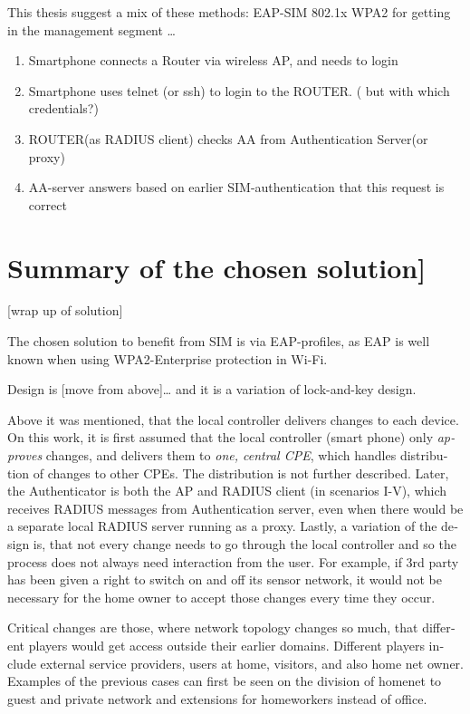 \documentclass[12pt,a4paper,english]{tutthesis}
\begin{document}
\begin{otherlanguage}{english}
This thesis suggest a mix of these methods: EAP-SIM 802.1x WPA2 for
getting in the management segment \ldots{}




\begin{enumerate}
\item Smartphone connects a Router via wireless AP, and needs to login
\item Smartphone uses telnet (or ssh) to login to the ROUTER.
( but with which credentials?)
\item ROUTER(as RADIUS client) checks AA from Authentication Server(or 
proxy)
\item AA-server answers based on earlier SIM-authentication that this
request is correct
\end{enumerate}
\section{Summary of the chosen solution]}
\label{sec-4-9}

[wrap up of solution]

The chosen solution to benefit from SIM is via EAP-profiles, as EAP
is well known when using WPA2-Enterprise protection in Wi-Fi.

Design is [move from above]\ldots{}
and it is a variation of lock-and-key design.

Above it was mentioned, that the local controller delivers changes to each
device. 
On this work, it is first assumed that the local controller (smart
phone) only \emph{approves} changes,
and delivers them to \emph{one, central CPE}, 
which handles distribution of changes to other CPEs. The distribution
is not further described. 
Later, the Authenticator is both the AP and
RADIUS client (in scenarios I-V), which receives RADIUS messages from
Authentication server, even when there would be a separate local RADIUS server
running as a proxy.
Lastly, a variation of the design is, that not every change needs to go
 through  the local controller and so the process does not always need
interaction from the user. For example, if 3rd party has been given 
a right to switch on and off its sensor network, it would not be 
necessary for the home owner to accept those changes every time they occur.



Critical changes are those, where network topology changes so much,
that different players would get access outside their earlier domains.
Different players include external service providers, users at home,
visitors, and also home net owner. Examples of the previous cases can first be
seen on the division of homenet to guest and private network and
extensions for homeworkers instead of office.



\end{otherlanguage}
\end{document}
